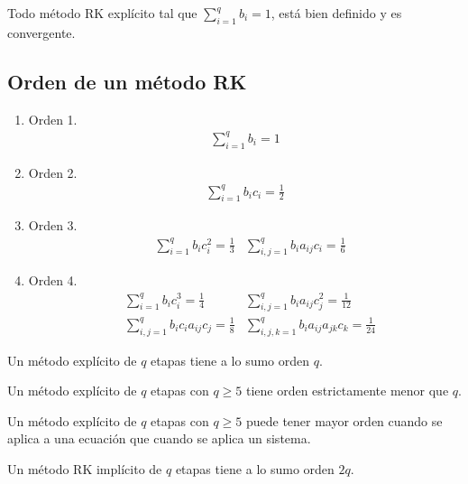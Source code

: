 \begin{cor}
Todo método RK explícito tal que $\sum_{i=1}^{q} b_i = 1$, está bien definido y es convergente.
\end{cor}

\subsection{Orden de un método RK}
\begin{enumerate}
    \item Orden 1.
    \begin{align*}
        \sum_{i=1}^{q} b_i = 1
    \end{align*}
    \item Orden 2.
    \begin{align*}
        \sum_{i=1}^{q} b_ic_i = \frac{1}{2}
    \end{align*}
    \item Orden 3.
    \begin{align*}
        &\sum_{i=1}^{q} b_ic_i^2 = \frac{1}{3} 
        &\sum_{i,j=1}^{q} b_ia_{ij}c_i = \frac{1}{6}
    \end{align*}
    \item Orden 4.
    \begin{align*}
        &\sum_{i=1}^{q} b_ic_i^3 = \frac{1}{4} 
        &\sum_{i,j=1}^{q} b_ia_{ij}c_j^2 = \frac{1}{12} \\
        &\sum_{i,j=1}^{q} b_ic_ia_{ij}c_j = \frac{1}{8} 
        &\sum_{i,j,k=1}^{q} b_ia_{ij}a_{jk}c_k = \frac{1}{24} 
    \end{align*}
\end{enumerate}

\begin{teo}
Un método explícito de $q$ etapas tiene a lo sumo orden $q$.
\end{teo}

\begin{teo}
Un método explícito de $q$ etapas con $q \ge 5$ tiene orden estrictamente menor que $q$.
\end{teo}

\begin{teo}
Un método explícito de $q$ etapas con $q \ge 5$ puede tener mayor orden cuando se aplica a una ecuación que cuando se aplica un sistema.
\end{teo}

\begin{teo}
Un método RK implícito de $q$ etapas tiene a lo sumo orden $2q$.
\end{teo}

